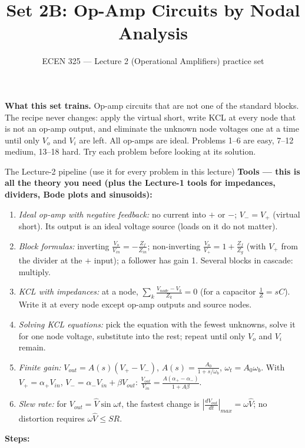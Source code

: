 \documentclass[11pt]{article}
\title{Set 2B: Op-Amp Circuits by Nodal Analysis}
\author{ECEN 325 --- Lecture 2 (Operational Amplifiers) practice set}
\date{}
\begin{document}
\maketitle

\textbf{What this set trains.} Op-amp circuits that are not one of the standard blocks. The recipe never changes:
apply the virtual short, write KCL at every node that is not an op-amp output, and eliminate the unknown node
voltages one at a time until only $V_o$ and $V_i$ are left. All op-amps are ideal. Problems 1--6 are easy, 7--12
medium, 13--18 hard. Try each problem before looking at its solution.


\begin{cardbox}{The Lecture-2 pipeline (use it for every problem in this lecture)}
\textbf{Tools --- this is all the theory you need (plus the Lecture-1 tools for impedances, dividers, Bode plots
and sinusoids):}
\begin{enumerate}[label=\textbf{T\arabic*},leftmargin=2.2em,itemsep=1pt]
\item \emph{Ideal op-amp with negative feedback:} no current into $+$ or $-$; $V_-=V_+$ (virtual short).
      Its output is an ideal voltage source (loads on it do not matter).
\item \emph{Block formulas:} inverting $\frac{V_o}{V_{in}}=-\frac{Z_f}{Z_{in}}$; non-inverting
      $\frac{V_o}{V_+}=1+\frac{Z_f}{Z_g}$ (with $V_+$ from the divider at the $+$ input); a follower has gain 1.
      Several blocks in cascade: multiply.
\item \emph{KCL with impedances:} at a node, $\sum_k \frac{V_{node}-V_k}{Z_k}=0$ (for a capacitor
      $\frac{1}{Z}=sC$). Write it at every node except op-amp outputs and source nodes.
\item \emph{Solving KCL equations:} pick the equation with the fewest unknowns, solve it for one node voltage,
      substitute into the rest; repeat until only $V_o$ and $V_i$ remain.
\item \emph{Finite gain:} $V_{out}=A(s)(V_+-V_-)$, $A(s)=\frac{A_0}{1+s/\omega_b}$, $\omega_t=A_0\omega_b$.
      With $V_+=\alpha_+V_{in}$, $V_-=\alpha_-V_{in}+\beta V_{out}$: $\frac{V_{out}}{V_{in}}=\frac{A(\alpha_+-\alpha_-)}{1+A\beta}$.
\item \emph{Slew rate:} for $V_{out}=\hat V\sin\omega t$, the fastest change is $\left|\frac{dV_{out}}{dt}\right|_{max}=\omega\hat V$;
      no distortion requires $\omega\hat V\le SR$.
\end{enumerate}
\textbf{Steps:}
\begin{enumerate}[leftmargin=2.2em,itemsep=1pt]

\end{enumerate}
\end{cardbox}
\end{document}
